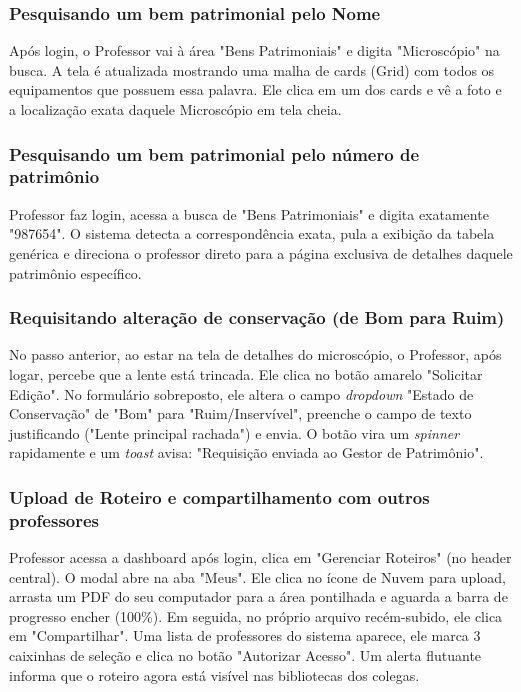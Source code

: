 \documentclass[12pt,a4paper]{article}
\begin{document}
\subsubsection{Pesquisando um bem patrimonial pelo Nome}
Após login, o Professor vai à área "Bens Patrimoniais" e digita "Microscópio" na busca. A tela é atualizada mostrando uma malha de cards (Grid) com todos os equipamentos que possuem essa palavra. Ele clica em um dos cards e vê a foto e a localização exata daquele Microscópio em tela cheia.

\subsubsection{Pesquisando um bem patrimonial pelo número de patrimônio}
Professor faz login, acessa a busca de "Bens Patrimoniais" e digita exatamente "987654". O sistema detecta a correspondência exata, pula a exibição da tabela genérica e direciona o professor direto para a página exclusiva de detalhes daquele patrimônio específico.

\subsubsection{Requisitando alteração de conservação (de Bom para Ruim)}
No passo anterior, ao estar na tela de detalhes do microscópio, o Professor, após logar, percebe que a lente está trincada. Ele clica no botão amarelo "Solicitar Edição". No formulário sobreposto, ele altera o campo \textit{dropdown} "Estado de Conservação" de "Bom" para "Ruim/Inservível", preenche o campo de texto justificando ("Lente principal rachada") e envia. O botão vira um \textit{spinner} rapidamente e um \textit{toast} avisa: "Requisição enviada ao Gestor de Patrimônio".

\subsubsection{Upload de Roteiro e compartilhamento com outros professores}
Professor acessa a dashboard após login, clica em "Gerenciar Roteiros" (no header central). O modal abre na aba "Meus". Ele clica no ícone de Nuvem para upload, arrasta um PDF do seu computador para a área pontilhada e aguarda a barra de progresso encher (100\%). Em seguida, no próprio arquivo recém-subido, ele clica em "Compartilhar". Uma lista de professores do sistema aparece, ele marca 3 caixinhas de seleção e clica no botão "Autorizar Acesso". Um alerta flutuante informa que o roteiro agora está visível nas bibliotecas dos colegas.
\end{document}
